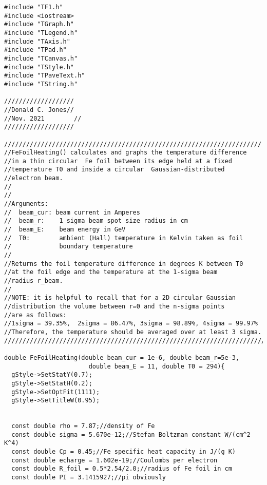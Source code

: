 \documentclass[12pt]{article}
\begin{document}
\begin{lstlisting}
#include "TF1.h"
#include <iostream>
#include "TGraph.h"
#include "TLegend.h"
#include "TAxis.h"
#include "TPad.h"
#include "TCanvas.h"
#include "TStyle.h"
#include "TPaveText.h"
#include "TString.h"

///////////////////
//Donald C. Jones//
//Nov. 2021        //
///////////////////

//////////////////////////////////////////////////////////////////////
//FeFoilHeating() calculates and graphs the temperature difference 
//in a thin circular  Fe foil between its edge held at a fixed 
//temperature T0 and inside a circular  Gaussian-distributed 
//electron beam.                                                 
//     
//                                                                               
//Arguments:                                                                         
//  beam_cur: beam current in Amperes                                                
//  beam_r:    1 sigma beam spot size radius in cm                                    
//  beam_E:    beam energy in GeV                                                      
//  T0:        ambient (Hall) temperature in Kelvin taken as foil 
//             boundary temperature 
//                                                                              
//Returns the foil temperature difference in degrees K between T0
//at the foil edge and the temperature at the 1-sigma beam 
//radius r_beam.       
//                       
//NOTE: it is helpful to recall that for a 2D circular Gaussian 
//distribution the volume between r=0 and the n-sigma points 
//are as follows:                           
//1sigma = 39.35%,  2sigma = 86.47%, 3sigma = 98.89%, 4sigma = 99.97%
//Therefore, the temperature should be averaged over at least 3 sigma.    
/////////////////////////////////////////////////////////////////////////

double FeFoilHeating(double beam_cur = 1e-6, double beam_r=5e-3, 
                       double beam_E = 11, double T0 = 294){
  gStyle->SetStatY(0.7);
  gStyle->SetStatH(0.2);
  gStyle->SetOptFit(1111);
  gStyle->SetTitleW(0.95);


  const double rho = 7.87;//density of Fe
  const double sigma = 5.670e-12;//Stefan Boltzman constant W/(cm^2 K^4)
  const double Cp = 0.45;//Fe specific heat capacity in J/(g K)
  const double echarge = 1.602e-19;//Coulombs per electron
  const double R_foil = 0.5*2.54/2.0;//radius of Fe foil in cm
  const double PI = 3.1415927;//pi obviously


\end{lstlisting}
\end{document}
